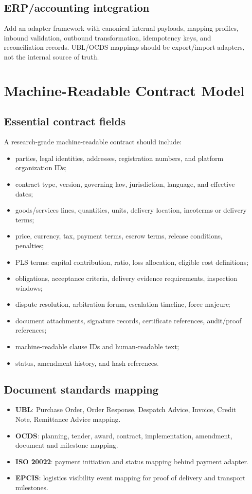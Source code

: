 \documentclass[11pt]{article}
\begin{document}
\subsection{ERP/accounting integration}
Add an adapter framework with canonical internal payloads, mapping profiles, inbound validation, outbound transformation, idempotency keys, and reconciliation records. UBL/OCDS mappings should be export/import adapters, not the internal source of truth.

\section{Machine-Readable Contract Model}

\subsection{Essential contract fields}
A research-grade machine-readable contract should include:
\begin{itemize}
  \item parties, legal identities, addresses, registration numbers, and platform organization IDs;
  \item contract type, version, governing law, jurisdiction, language, and effective dates;
  \item goods/services lines, quantities, units, delivery location, incoterms or delivery terms;
  \item price, currency, tax, payment terms, escrow terms, release conditions, penalties;
  \item PLS terms: capital contribution, ratio, loss allocation, eligible cost definitions;
  \item obligations, acceptance criteria, delivery evidence requirements, inspection windows;
  \item dispute resolution, arbitration forum, escalation timeline, force majeure;
  \item document attachments, signature records, certificate references, audit/proof references;
  \item machine-readable clause IDs and human-readable text;
  \item status, amendment history, and hash references.
\end{itemize}

\subsection{Document standards mapping}
\begin{itemize}
  \item \textbf{UBL}: Purchase Order, Order Response, Despatch Advice, Invoice, Credit Note, Remittance Advice mapping.
  \item \textbf{OCDS}: planning, tender, award, contract, implementation, amendment, document and milestone mapping.
  \item \textbf{ISO 20022}: payment initiation and status mapping behind payment adapter.
  \item \textbf{EPCIS}: logistics visibility event mapping for proof of delivery and transport milestones.
\end{itemize}
\end{document}
